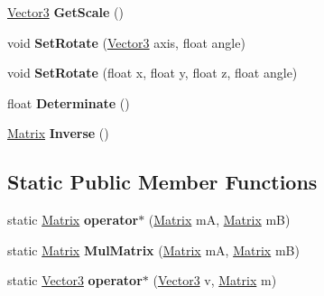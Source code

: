 \begin{DoxyCompactItemize}
\item 
\hypertarget{class_engine_1_1_matrix_a35e7315181976567ae2a212015fafd9b}{\hyperlink{struct_engine_1_1_vector3}{Vector3} {\bfseries Get\-Scale} ()}\label{class_engine_1_1_matrix_a35e7315181976567ae2a212015fafd9b}

\item 
\hypertarget{class_engine_1_1_matrix_a776a4dd4e2891049fa2c9e09e567cda2}{void {\bfseries Set\-Rotate} (\hyperlink{struct_engine_1_1_vector3}{Vector3} axis, float angle)}\label{class_engine_1_1_matrix_a776a4dd4e2891049fa2c9e09e567cda2}

\item 
\hypertarget{class_engine_1_1_matrix_abf811cd4aa59b3c4e19ee3c36ea95623}{void {\bfseries Set\-Rotate} (float x, float y, float z, float angle)}\label{class_engine_1_1_matrix_abf811cd4aa59b3c4e19ee3c36ea95623}

\item 
\hypertarget{class_engine_1_1_matrix_a6ae8c411ad62cbfb228bc6b209e6ef3a}{float {\bfseries Determinate} ()}\label{class_engine_1_1_matrix_a6ae8c411ad62cbfb228bc6b209e6ef3a}

\item 
\hypertarget{class_engine_1_1_matrix_a9f6c2c55a3c018efa85c1d007f750028}{\hyperlink{class_engine_1_1_matrix}{Matrix} {\bfseries Inverse} ()}\label{class_engine_1_1_matrix_a9f6c2c55a3c018efa85c1d007f750028}

\end{DoxyCompactItemize}
\subsection*{Static Public Member Functions}
\begin{DoxyCompactItemize}
\item 
\hypertarget{class_engine_1_1_matrix_a24ccffdd00dd42e9992f6e37ace9be03}{static \hyperlink{class_engine_1_1_matrix}{Matrix} {\bfseries operator$\ast$} (\hyperlink{class_engine_1_1_matrix}{Matrix} m\-A, \hyperlink{class_engine_1_1_matrix}{Matrix} m\-B)}\label{class_engine_1_1_matrix_a24ccffdd00dd42e9992f6e37ace9be03}

\item 
\hypertarget{class_engine_1_1_matrix_a4d7d7f77d24ad783bb668b4134482533}{static \hyperlink{class_engine_1_1_matrix}{Matrix} {\bfseries Mul\-Matrix} (\hyperlink{class_engine_1_1_matrix}{Matrix} m\-A, \hyperlink{class_engine_1_1_matrix}{Matrix} m\-B)}\label{class_engine_1_1_matrix_a4d7d7f77d24ad783bb668b4134482533}

\item 
\hypertarget{class_engine_1_1_matrix_aa065662682a075a48bc29372716651ea}{static \hyperlink{struct_engine_1_1_vector3}{Vector3} {\bfseries operator$\ast$} (\hyperlink{struct_engine_1_1_vector3}{Vector3} v, \hyperlink{class_engine_1_1_matrix}{Matrix} m)}\label{class_engine_1_1_matrix_aa065662682a075a48bc29372716651ea}

\end{DoxyCompactItemize}
